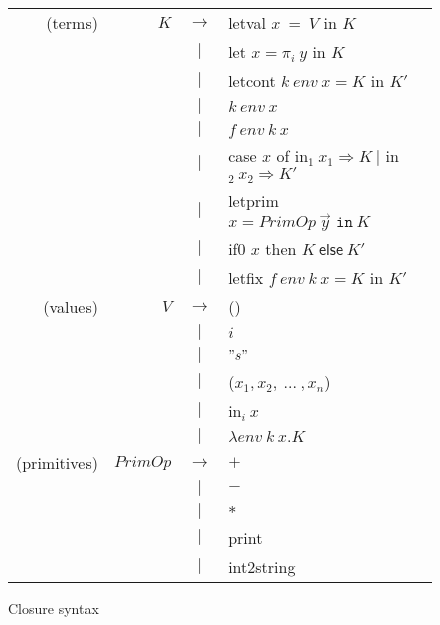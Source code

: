 \documentclass{article}
\theoremstyle{definition}
\theoremstyle{remark}
\numberwithin{equation}{section}
\begin{document}
\begin{figure}[!ht]
  \centering
\begin{tabular}{rrcl}
(terms) & $K$ & $\to$ & \textsf{letval }$x\ =\ V$ \textsf{ in } $K$ \\
        &     & $|$ & \textsf{let }$x = \pi _i\ y$\textsf{ in }$K$\\
        &     & $|$ & \textsf{letcont }$k\ env\ x = K$\textsf{ in }$K'$\\
        &     & $|$ &  $k\ env\ x$ \\
        &     & $|$ & $f\ env\ k\ x$ \\
        &     & $|$ & \textsf{case} $x$ \textsf{of in}$_1\ x_1 \Rightarrow K
                    \ |$ \textsf{in}$_2\ x_2 \Rightarrow K'$\\
        &     & $|$ & \textsf{letprim} $x=PrimOp\ \vec{y}
         \texttt{ in}\ K$\\
        &     & $|$ &\textsf{if0} $x$ \textsf{then} $K\ \textsf{else}\ K'$\\
        &     & $|$ &\textsf{letfix }$f\ env\ k\ x=K$\textsf{ in }$K'$\\

(values) & $V$ & $\to$ & () \\
        &     & $|$ & $i$\\
        &     & $|$ & $"s"$\\
        &     & $|$ & ($x_1,x_2,\ ...\ , x_n$)\\
        &     & $|$ & \textsf{in}$_i\ x$\\
        &     & $|$ &  $\lambda env\ k\ x.K$ \\

(primitives) & $PrimOp$ & $\to$ & $+$ \\
        &     & $|$ & $-$\\
        &     & $|$ & $*$\\
        &     & $|$ & \textsf{print}\\
        &     & $|$ & \textsf{int2string}\\
\end{tabular}
  \caption{Closure syntax}
  \label{fig-sub}
\end{figure}
\end{document}
